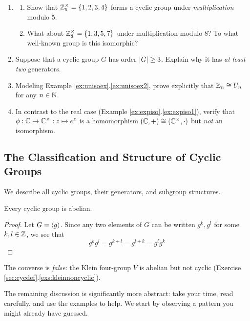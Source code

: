 \begin{exercises}
\begin{enumerate}
		  
	  \item\label{exs:z5times2}
	  \begin{enumerate}
	    \item Show that $\mathbb{Z}_5^\times=\{1,2,3,4\}$ forms a cyclic group under \emph{multiplication} modulo 5.
	  	\item What about $\mathbb{Z}_8^\times=\{1,3,5,7\}$ under multiplication modulo 8? To what well-known group is this isomorphic?
	  \end{enumerate}
	  
	  
	  \item Suppose that a cyclic group $G$ has order $\left| G\right|\ge 3$. Explain why it has \emph{at least two} generators.
	
		
		\item Modeling Example \ref*{ex:unisoex}.\ref{ex:unisoex2}, prove explicitly that $\mathbb{Z}_n\cong U_n$ for any $n\in\mathbb{N}$.
		
	  
	  \item In contrast to the real case (Example \ref*{ex:expiso}.\ref{ex:expiso1}), verify that $\phi:\mathbb{C}\to\mathbb{C}^\times:z\mapsto e^z$ is a homomorphism $(\mathbb{C},+)\cong(\mathbb{C}^\times,\cdot)$ but \emph{not} an isomorphism.
	 
	\end{enumerate}
\end{exercises}

\clearpage



\subsection{The Classification and Structure of Cyclic Groups}\label{sec:cyclicclass}

We describe all cyclic groups, their generators, and subgroup structures. 

\begin{lemm}{}{}
	Every cyclic group is abelian.
\end{lemm}

\begin{proof}
	Let $G=\left\langle g\right\rangle$. Since any two elements of $G$ can be written $g^k,g^l$ for some $k,l\in\mathbb{Z}$, we see that
	\[
		g^kg^l=g^{k+l}=g^{l+k}=g^lg^k\tag*{\qedhere}
	\]
\end{proof}

The converse is \emph{false}: the Klein four-group $V$ is abelian but not cyclic (Exercise \ref*{sec:cycdef}.\ref{exs:kleinnoncyclic}).\smallbreak

The remaining discussion is significantly more abstract: take your time, read carefully, and use the examples to help. We start by observing a pattern you might already have guessed.


